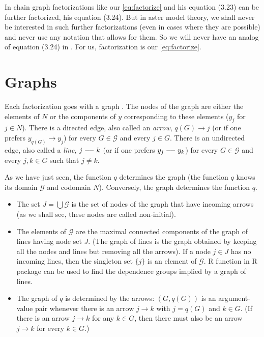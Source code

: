 In \citet{lauritzen} chain graph factorizations like our \eqref{eq:factorize}
and his equation (3.23) can be further factorized, his equation (3.24).
But in aster model theory, we shall never be interested in such further
factorizations (even in cases where they are possible) and never use any
notation that allows for them.  So we will never have an analog of equation
(3.24) in \citet{lauritzen}.  For us, factorization is our \eqref{eq:factorize}.

\section{Graphs}

Each factorization goes with a graph \citep[Section~3.2.3]{lauritzen}.
The nodes of the graph are either the elements of $N$ or the components
of $y$ corresponding to these elements ($y_j$ for $j \in N$).
There is a directed edge, also called an \emph{arrow},
$q(G) \longrightarrow j$ (or if one prefers $y_{q(G)} \longrightarrow y_j$)
for every $G \in \mathcal{G}$ and every $j \in G$.
There is an undirected edge, also called a \emph{line},
$j \myline k$ (or if one prefers $y_j \myline y_k$)
for every $G \in \mathcal{G}$ and every $j, k \in G$ such that $j \neq k$.

As we have just seen, the function $q$ determines the graph
(the function $q$ knows its domain $\mathcal{G}$ and codomain $N$).
Conversely, the graph determines the function $q$.
\begin{itemize}
\item The set $J = \bigcup \mathcal{G}$ is the set of nodes of the graph
    that have incoming arrows (as we shall see, these nodes are called
    non-initial).
\item The elements of $\mathcal{G}$ are the maximal connected components
    of the graph of lines having node set $J$.
    (The graph of lines is the graph obtained by keeping all the nodes
    and lines but removing all the arrows).
    If a node $j \in J$ has no incoming lines, then the singleton set $\{j\}$
    is an element of $\mathcal{G}$.
    R function  in R package  \citep{pooh-package}
    can be used to find the dependence groups implied by a graph of lines.
\item The graph of $q$ is determined by the arrows: $(G, q(G))$ is an
    argument-value pair whenever there is an arrow $j \longrightarrow k$
    with $j = q(G)$ and $k \in G$.
    (If there is an arrow $j \longrightarrow k$ for any $k \in G$,
    then there must also be an arrow $j \longrightarrow k$
    for every $k \in G$.)

\end{itemize}

